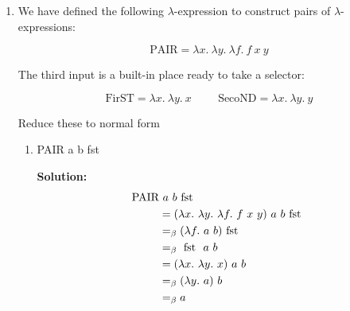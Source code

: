 \documentclass[11pt]{report}
\begin{document}
\begin{enumerate}
\begin{enumerate}
		{\bf Solution:}
			\begin{align*}
				\MULT &\ \TWO \ \THREE \\
				&= (\lambda m. \ \lambda n. \ \lambda u. \ \lambda v. \ m \ (n \ u) \ v) \ \TWO \ \THREE \\
				&\beq \lambda u. \ \lambda v. \ \TWO \ (\THREE \ u) \ v \\
				&= \lambda u. \ \lambda v. \ (\lambda s. \ \lambda x. \ s \ (s \ x)) \ (\THREE \ u) \ v \\
				&\beq \lambda u. \ \lambda v. \ (\THREE \ u) \ (\THREE \ u \ v)\\
				&= \lambda u. \ \lambda v. \ (\THREE \ u) \ ((\lambda s. \ \lambda x. \  s \ (s \ (s \ x))) \ u \ v)\\
				&\beq \lambda u. \ \lambda v. \ (\THREE \ u) \ (u \ (u \ (u \ v)))\\
				&= \lambda u. \ \lambda v. \ ((\lambda s. \ \lambda x. \  s \ (s \ (s \ x))) \ u) \ (u \ (u \ (u \ v)))\\
				&\beq \lambda u. \ \lambda v. \ (\lambda x. \  u \ (u \ (u \ x))) \ (u \ (u \ (u \ v)))\\
				&\beq \lambda u. \ \lambda v. \ u \ (u \ (u \ (u \ (u \ (u \ v)))))\\
				&\aeq \SIX
			\end{align*}		
	\end{enumerate}

	\newpage
	\item We have defined the following $\lambda$-expression to construct pairs of $\lambda$-expressions:
	
	$$\text{PAIR} = \lambda x. \ \lambda y. \ \lambda f. \ f \ x \ y$$

	The third input is a built-in place ready to take a selector:

	$$\text{FirST} = \lambda x. \ \lambda y. \ x \hspace{1cm} \text{SecoND} = \lambda x. \ \lambda y. \ y$$

	 Reduce these to normal form 

	\begin{enumerate}
			\item PAIR a b fst 
			
			{\bf Solution:}
			\begin{align*}
				\PAIR & \ a \ b \ \fst \\
				&= (\lambda x. \ \lambda y. \ \lambda f. \ f \ x \ y) \ a \ b \ \fst \\
				&\beq (\lambda f. \ a \ b) \ \fst \\
				&\beq \ \fst \ a \ b \\
				&= (\lambda x. \ \lambda y. \ x) \ a \ b \\
				&\beq (\lambda y. \ a) \ b \\
				&\beq a
			\end{align*}


\end{enumerate}
\end{enumerate}
\end{document}
